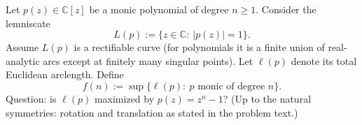 Let $p(z)\in\mathbb C[z]$ be a monic polynomial of degree $n\ge1$.  Consider the lemniscate
\[
L(p):=\{z\in\mathbb C:\ |p(z)|=1\}.
\]
Assume $L(p)$ is a rectifiable curve (for polynomials it is a finite union of real-analytic arcs except at finitely many singular points).  Let $\ell(p)$ denote its total Euclidean arclength.  Define
\[
 f(n):=\sup\{\ell(p):\ p\text{ monic of degree }n\}.
\]
Question: is $\ell(p)$ maximized by $p(z)=z^n-1$?  (Up to the natural symmetries: rotation and translation as stated in the problem text.)
